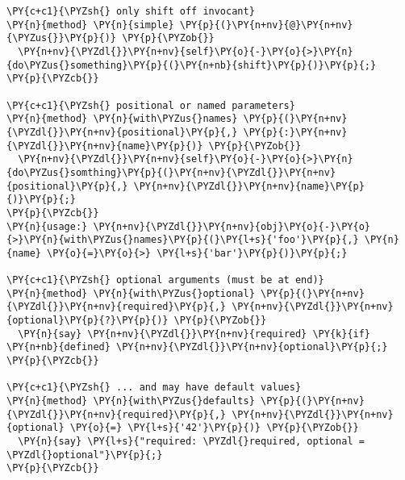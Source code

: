 \begin{Verbatim}[commandchars=\\\{\}]
\PY{c+c1}{\PYZsh{} only shift off invocant}
\PY{n}{method} \PY{n}{simple} \PY{p}{(}\PY{n+nv}{@}\PY{n+nv}{\PYZus{}}\PY{p}{)} \PY{p}{\PYZob{}}
  \PY{n+nv}{\PYZdl{}}\PY{n+nv}{self}\PY{o}{-}\PY{o}{>}\PY{n}{do\PYZus{}something}\PY{p}{(}\PY{n+nb}{shift}\PY{p}{)}\PY{p}{;}
\PY{p}{\PYZcb{}}

\PY{c+c1}{\PYZsh{} positional or named parameters}
\PY{n}{method} \PY{n}{with\PYZus{}names} \PY{p}{(}\PY{n+nv}{\PYZdl{}}\PY{n+nv}{positional}\PY{p}{,} \PY{p}{:}\PY{n+nv}{\PYZdl{}}\PY{n+nv}{name}\PY{p}{)} \PY{p}{\PYZob{}}
  \PY{n+nv}{\PYZdl{}}\PY{n+nv}{self}\PY{o}{-}\PY{o}{>}\PY{n}{do\PYZus{}somthing}\PY{p}{(}\PY{n+nv}{\PYZdl{}}\PY{n+nv}{positional}\PY{p}{,} \PY{n+nv}{\PYZdl{}}\PY{n+nv}{name}\PY{p}{)}\PY{p}{;}
\PY{p}{\PYZcb{}}
\PY{n}{usage:} \PY{n+nv}{\PYZdl{}}\PY{n+nv}{obj}\PY{o}{-}\PY{o}{>}\PY{n}{with\PYZus{}names}\PY{p}{(}\PY{l+s}{'foo'}\PY{p}{,} \PY{n}{name} \PY{o}{=}\PY{o}{>} \PY{l+s}{'bar'}\PY{p}{)}\PY{p}{;}

\PY{c+c1}{\PYZsh{} optional arguments (must be at end)}
\PY{n}{method} \PY{n}{with\PYZus{}optional} \PY{p}{(}\PY{n+nv}{\PYZdl{}}\PY{n+nv}{required}\PY{p}{,} \PY{n+nv}{\PYZdl{}}\PY{n+nv}{optional}\PY{p}{?}\PY{p}{)} \PY{p}{\PYZob{}}
  \PY{n}{say} \PY{n+nv}{\PYZdl{}}\PY{n+nv}{required} \PY{k}{if} \PY{n+nb}{defined} \PY{n+nv}{\PYZdl{}}\PY{n+nv}{optional}\PY{p}{;}
\PY{p}{\PYZcb{}}

\PY{c+c1}{\PYZsh{} ... and may have default values}
\PY{n}{method} \PY{n}{with\PYZus{}defaults} \PY{p}{(}\PY{n+nv}{\PYZdl{}}\PY{n+nv}{required}\PY{p}{,} \PY{n+nv}{\PYZdl{}}\PY{n+nv}{optional} \PY{o}{=} \PY{l+s}{'42'}\PY{p}{)} \PY{p}{\PYZob{}}
  \PY{n}{say} \PY{l+s}{"required: \PYZdl{}required, optional = \PYZdl{}optional"}\PY{p}{;} 
\PY{p}{\PYZcb{}}
\end{Verbatim}
